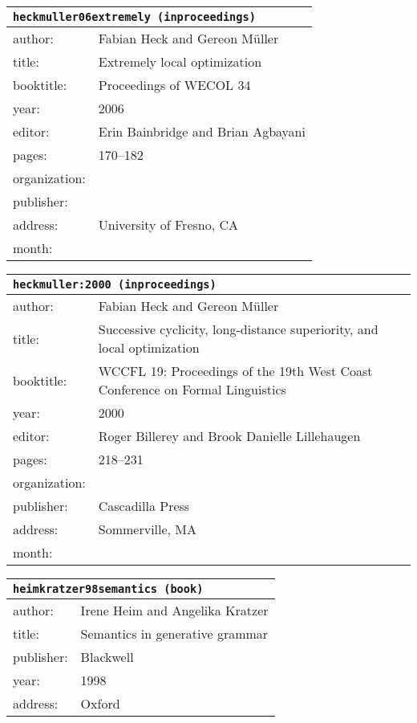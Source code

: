 \documentclass{article}
\begin{document}
\bigskip

\begin{tabular}{p{}p{}}
\multicolumn{2}{l}{\texttt{heckmuller06extremely (inproceedings)}}\\
\hline
author: & Fabian Heck and Gereon M{\"u}ller\\
title: & Extremely local optimization\\
booktitle: & Proceedings of WECOL 34\\
year: & 2006\\
editor: & Erin Bainbridge and Brian Agbayani\\
pages: & 170--182\\
organization: & \\
publisher: & \\
address: & University of Fresno, CA\\
month: & \\
\end{tabular}

\bigskip

\begin{tabular}{p{}p{}}
\multicolumn{2}{l}{\texttt{heckmuller:2000 (inproceedings)}}\\
\hline
author: & Fabian Heck and Gereon M{\"u}ller\\
title: & Successive cyclicity, long-distance superiority, and local optimization\\
booktitle: & WCCFL 19: Proceedings of the 19th West Coast Conference on Formal Linguistics\\
year: & 2000\\
editor: & Roger Billerey and Brook Danielle Lillehaugen\\
pages: & 218--231\\
organization: & \\
publisher: & Cascadilla Press\\
address: & Sommerville, MA\\
month: & \\
\end{tabular}

\bigskip

\begin{tabular}{p{}p{}}
\multicolumn{2}{l}{\texttt{heimkratzer98semantics (book)}}\\
\hline
author: & Irene Heim and Angelika Kratzer\\
title: & Semantics in generative grammar\\
publisher: & Blackwell\\
year: & 1998\\
address: & Oxford\\
\end{tabular}
\end{document}
